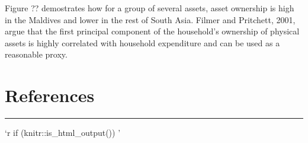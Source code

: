 \documentclass[13 pt,]{book}
\begin{document}
Figure ?? demostrates how for a group of several assets, asset ownership
is high in the Maldives and lower in the rest of South Asia. Filmer and
Pritchett, 2001, argue that the first principal component of the
household's ownership of physical assets is highly correlated with
household expenditure and can be used as a reasonable proxy.

\chapter*{References}\label{references}

\begin{center}\rule{0.5\linewidth}{\linethickness}\end{center}

`r if (knitr::is\_html\_output()) '


\end{document}
